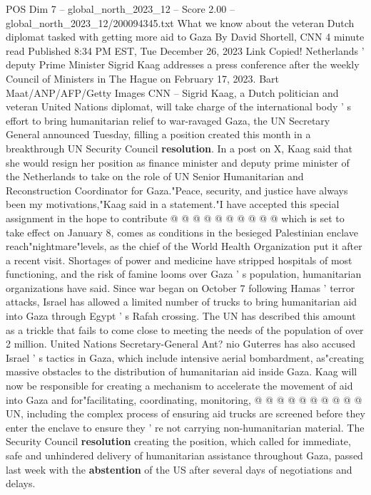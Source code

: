 \begin{textsample}{POS Dim 7 – global\_north\_2023\_12 – Score 2.00 – global\_north\_2023\_12/200094345.txt}  \label{ex:f7_pos_308}
What we know about the veteran Dutch diplomat tasked with getting more aid to Gaza By David Shortell, CNN 4 minute read Published 8:34 PM EST, Tue December 26, 2023 Link Copied!
Netherlands ' deputy Prime Minister Sigrid Kaag addresses a press conference after the weekly Council of Ministers in The Hague on February 17, 2023.
Bart Maat/ANP/AFP/Getty Images CNN -- Sigrid Kaag, a Dutch politician and veteran United Nations diplomat, will take charge of the international body ' s effort to bring humanitarian relief to war-ravaged Gaza, the UN Secretary General announced Tuesday, filling a position created this month in a breakthrough UN Security Council \textbf{resolution}.
In a post on X, Kaag said that she would resign her position as finance minister and deputy prime minister of the Netherlands to take on the role of UN Senior Humanitarian and Reconstruction Coordinator for Gaza."Peace, security, and justice have always been my motivations,"Kaag said in a statement."I have accepted this special assignment in the hope to contribute @ @ @ @ @ @ @ @ @ @ which is set to take effect on January 8, comes as conditions in the besieged Palestinian enclave reach"nightmare"levels, as the chief of the World Health Organization put it after a recent visit.
Shortages of power and medicine have stripped hospitals of most functioning, and the risk of famine looms over Gaza ' s population, humanitarian organizations have said.
Since war began on October 7 following Hamas ' terror attacks, Israel has allowed a limited number of trucks to bring humanitarian aid into Gaza through Egypt ' s Rafah crossing.
The UN has described this amount as a trickle that fails to come close to meeting the needs of the population of over 2 million.
United Nations Secretary-General Ant? nio Guterres has also accused Israel ' s tactics in Gaza, which include intensive aerial bombardment, as"creating massive obstacles to the distribution of humanitarian aid inside Gaza.
Kaag will now be responsible for creating a mechanism to accelerate the movement of aid into Gaza and for"facilitating, coordinating, monitoring, @ @ @ @ @ @ @ @ @ @ UN, including the complex process of ensuring aid trucks are screened before they enter the enclave to ensure they ' re not carrying non-humanitarian material.
The Security Council \textbf{resolution} creating the position, which called for immediate, safe and unhindered delivery of humanitarian assistance throughout Gaza, passed last week with the \textbf{abstention} of the US after several days of negotiations and delays.

\end{textsample}
